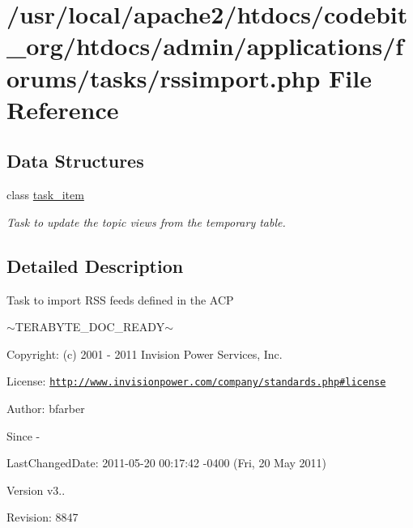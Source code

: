 \hypertarget{rssimport_8php}{\section{/usr/local/apache2/htdocs/codebit\-\_\-org/htdocs/admin/applications/forums/tasks/rssimport.php File Reference}
\label{rssimport_8php}
}
\subsection*{Data Structures}
\begin{DoxyCompactItemize}
\item 
class \hyperlink{classtask__item}{task\-\_\-item}
\begin{DoxyCompactList}\small\item\em Task to update the topic views from the temporary table. \end{DoxyCompactList}\end{DoxyCompactItemize}


\subsection{Detailed Description}
\begin{DoxyVerb}  Task to import RSS feeds defined in the ACP
\end{DoxyVerb}
 $\sim$\-T\-E\-R\-A\-B\-Y\-T\-E\-\_\-\-D\-O\-C\-\_\-\-R\-E\-A\-D\-Y$\sim$ \begin{DoxyParagraph}{Copyright\-:}
(c) 2001 -\/ 2011 Invision Power Services, Inc.
\end{DoxyParagraph}
\begin{DoxyParagraph}{License\-:}
\href{http://www.invisionpower.com/company/standards.php#license}{\tt http\-://www.\-invisionpower.\-com/company/standards.\-php\#license}
\end{DoxyParagraph}
\begin{DoxyParagraph}{Author\-:}
bfarber 
\end{DoxyParagraph}
\begin{DoxySince}{Since}
-\/ 
\end{DoxySince}
\begin{DoxyParagraph}{Last\-Changed\-Date\-:}
2011-\/05-\/20 00\-:17\-:42 -\/0400 (Fri, 20 May 2011) 
\end{DoxyParagraph}
\begin{DoxyVersion}{Version}
v3.. 
\end{DoxyVersion}
\begin{DoxyParagraph}{Revision\-:}
8847 
\end{DoxyParagraph}
